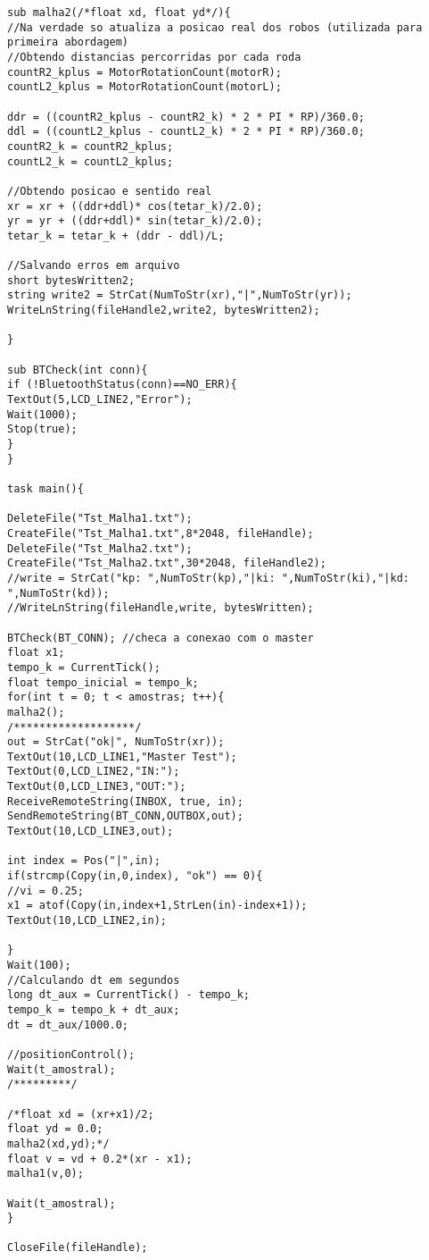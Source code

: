 \begin{apendicesenv}
\begin{lstlisting}
sub malha2(/*float xd, float yd*/){
//Na verdade so atualiza a posicao real dos robos (utilizada para primeira abordagem)
//Obtendo distancias percorridas por cada roda
countR2_kplus = MotorRotationCount(motorR);
countL2_kplus = MotorRotationCount(motorL);

ddr = ((countR2_kplus - countR2_k) * 2 * PI * RP)/360.0;
ddl = ((countL2_kplus - countL2_k) * 2 * PI * RP)/360.0;
countR2_k = countR2_kplus;
countL2_k = countL2_kplus;

//Obtendo posicao e sentido real
xr = xr + ((ddr+ddl)* cos(tetar_k)/2.0);
yr = yr + ((ddr+ddl)* sin(tetar_k)/2.0);
tetar_k = tetar_k + (ddr - ddl)/L;

//Salvando erros em arquivo
short bytesWritten2;
string write2 = StrCat(NumToStr(xr),"|",NumToStr(yr));
WriteLnString(fileHandle2,write2, bytesWritten2);

}

sub BTCheck(int conn){
if (!BluetoothStatus(conn)==NO_ERR){
TextOut(5,LCD_LINE2,"Error");
Wait(1000);
Stop(true);
}
}

task main(){

DeleteFile("Tst_Malha1.txt");
CreateFile("Tst_Malha1.txt",8*2048, fileHandle);
DeleteFile("Tst_Malha2.txt");
CreateFile("Tst_Malha2.txt",30*2048, fileHandle2);
//write = StrCat("kp: ",NumToStr(kp),"|ki: ",NumToStr(ki),"|kd: ",NumToStr(kd));
//WriteLnString(fileHandle,write, bytesWritten);

BTCheck(BT_CONN); //checa a conexao com o master
float x1;
tempo_k = CurrentTick();
float tempo_inicial = tempo_k;
for(int t = 0; t < amostras; t++){
malha2();
/*******************/
out = StrCat("ok|", NumToStr(xr));
TextOut(10,LCD_LINE1,"Master Test");
TextOut(0,LCD_LINE2,"IN:");
TextOut(0,LCD_LINE3,"OUT:");
ReceiveRemoteString(INBOX, true, in);
SendRemoteString(BT_CONN,OUTBOX,out);
TextOut(10,LCD_LINE3,out);

int index = Pos("|",in);
if(strcmp(Copy(in,0,index), "ok") == 0){
//vi = 0.25;
x1 = atof(Copy(in,index+1,StrLen(in)-index+1));
TextOut(10,LCD_LINE2,in);

}
Wait(100);
//Calculando dt em segundos
long dt_aux = CurrentTick() - tempo_k;
tempo_k = tempo_k + dt_aux;
dt = dt_aux/1000.0;

//positionControl();
Wait(t_amostral);
/*********/

/*float xd = (xr+x1)/2;
float yd = 0.0;
malha2(xd,yd);*/
float v = vd + 0.2*(xr - x1);
malha1(v,0);

Wait(t_amostral);
}

CloseFile(fileHandle);


\end{lstlisting}
\end{apendicesenv}
